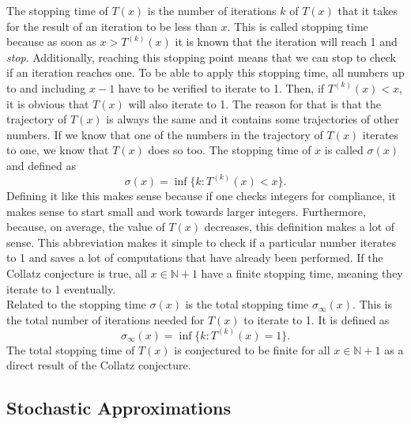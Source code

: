 \documentclass[12pt,a4paper,reqno]{amsart}
\begin{document}
The stopping time of $T(x)$ is the number of iterations $k$ of $T(x)$ that it takes
for the result of an iteration to be less than $x$. This is called stopping 
time because as soon as $x > T^{(k)}(x)$ it is known that the iteration will
reach 1 and \textit{stop}. Additionally, reaching this stopping point means
that we can stop to check if an iteration reaches one. To be able to apply this 
stopping time, all numbers 
up to and including $x-1$ have to be verified to iterate to 1. Then, if $T^{(k)}(x) < x$, 
it is obvious that $T(x)$ will also iterate to 1. The reason for that is that
the trajectory of $T(x)$ is always the same and it contains some trajectories
of other numbers. If we know that one of the numbers in the trajectory of
$T(x)$ iterates to one, we know that $T(x)$ does so too.
The stopping time of $x$ is called $\sigma(x)$ and defined as
\begin{equation}
    \nonumber
    \sigma(x)=\inf\{k:T^{(k)}(x) < x\}.
\end{equation}
Defining it like this
makes sense because if one checks integers for compliance, it makes sense to
start small and work towards larger integers. Furthermore, because, on average,
the value of $T(x)$ decreases, this definition makes a lot of sense. This 
abbreviation makes it simple to check if a particular number iterates to 1 and
saves a lot of computations that have already been performed. If the Collatz 
conjecture is true, all $x \in \mathbb{N} + 1$ have a finite stopping time, 
meaning they iterate to 1 eventually. \\
Related to the stopping time $\sigma(x)$ is the total stopping time
$\sigma_{\infty}(x)$. This is the total number of iterations needed for $T(x)$ 
to iterate to 1. It is defined as
\begin{equation}
    \nonumber
    \sigma_{\infty}(x)=\inf\{k:T^{(k)}(x)=1\}.
\end{equation}
The total stopping time of $T(x)$ is conjectured to be finite for all $x \in
\mathbb{N} + 1$ as a direct result of the Collatz conjecture.

\subsection{Stochastic Approximations}
\end{document}
